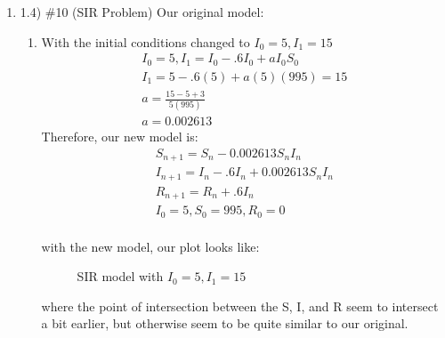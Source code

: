 \documentclass[12pt,letterpaper]{article}
\begin{document}
\begin{enumerate}
\item 1.4) \#10 (SIR Problem)
Our original model: 
\begin{enumerate}
  \item With the initial conditions changed to $I_{0} = 5, I_{1} = 15$
  \begin{eqnarray*}
    I_{0} = 5, I_{1} = I_{0}-.6I_{0}+aI_{0}S_{0}\\
    I_{1} = 5 - .6(5) + a(5)(995) = 15\\
    a = \frac{15-5+3}{5(995)}\\
    a = 0.002613
  \end{eqnarray*}
  Therefore, our new model is: 
  \begin{eqnarray*}
    S_{n+1} = S_{n} - 0.002613S_{n}I_{n}\\
    I_{n+1} = I_{n} - .6I_{n} + 0.002613S_{n}I_{n}\\
    R_{n+1} = R_{n} + .6I_{n} \\
    I_{0} = 5, S_{0} = 995, R_{0} = 0
  \end{eqnarray*}\\
  with the new model, our plot looks like: 
  \begin{figure}[!htb]
    \caption{\label{fig:10} SIR model with $I_{0} = 5, I_{1} = 15$}
  \end{figure}
  where the point of intersection between the S, I, and R seem to intersect a bit 
  earlier, but otherwise seem to be quite similar to our original. 


\end{enumerate}
\end{enumerate}
\end{document}
